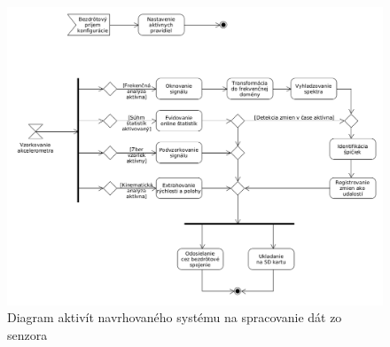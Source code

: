 \begin{figure}[h]
	\centering
	\includegraphics[width=\textwidth]{figures/design.png}
	\caption{Diagram aktivít navrhovaného systému na spracovanie dát zo senzora}
	\label{fig:design}
\end{figure}

\emptypage
